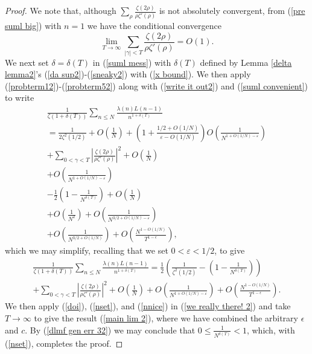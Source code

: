 \documentclass[11pt,article]{amsart}
\numberwithin{equation}{section}
\numberwithin{equation}{section}
\numberwithin{lemma}{section}
\numberwithin{prop}{section}
\begin{document}
\begin{proof}
We note that, although $\sum_{\rho}\frac{\zeta(2\rho)}{\rho\zeta'(\rho)}$ is not absolutely convergent, from (\ref{pre suml big}) with $n=1$ we have the conditional convergence
\begin{equation}
\lim_{T\rightarrow \infty}\sum_{\left|\gamma\right|<T}\frac{\zeta(2\rho)}{\rho\zeta'(\rho)}=O(1). \label{suml convenient}
\end{equation}
We next set $\delta=\delta(T)$ in (\ref{suml mess}) with $\delta(T)$ defined by Lemma \ref{delta lemma2}'s (\ref{da sup2})-(\ref{sneaky2}) with (\ref{x bound}). We then apply (\ref{probterm12})-(\ref{probterm52}) along with (\ref{write it out2}) and (\ref{suml convenient}) to write 
\begin{align}
\frac{1}{\zeta\left(1+\delta(T)\right)}\sum_{n\leq N}\frac{\lambda(n)L(n-1)}{n^{1+\delta(T)}} \nonumber\\ =\frac{1}{2\zeta^{2}(1/2)}+O\left(\frac{1}{N}\right)+\left(1+\frac{1/2+O(1/N)}{\varepsilon-O(1/N)}\right)O\left(\frac{1}{N^{1+O(1/N)-\varepsilon}}\right) \nonumber\\ 
+\sum_{0<\gamma<T}\left|\frac{\zeta(2\rho)}{\rho\zeta'(\rho)}\right|^{2}+O\left(\frac{1}{N}\right) \nonumber\\ +O\left(\frac{1}{N^{1+O(1/N)-\varepsilon}}\right) \nonumber\\ -\frac{1}{2}\left(1-\frac{1}{N^{\delta(T)}}\right)+O\left(\frac{1}{N}\right) \nonumber \\
+O\left(\frac{1}{N^{2}}\right) +O\left(\frac{1}{N^{3/2+O(1/N)-\varepsilon}}\right) \nonumber\\ 
+O\left(\frac{1}{N^{3/2+O(1/N)}}\right) +O\left(\frac{N^{1-O(1/N)}}{T^{1-\epsilon}}\right), \label{suml mess big os}
\end{align}
which we may simplify, recalling that we set $0<\varepsilon<1/2$, to give
\begin{align}
\frac{1}{\zeta\left(1+\delta(T)\right)}\sum_{n\leq N}\frac{\lambda(n)L(n-1)}{n^{1+\delta(T)}}=\frac{1}{2}\left(\frac{1}{\zeta^{2}(1/2)}-\left(1-\frac{1}{N^{\delta(T)}}\right)\right) \nonumber\\ +\sum_{0<\gamma<T}\left|\frac{\zeta(2\rho)}{\rho\zeta'(\rho)}\right|^{2}+O\left(\frac{1}{N}\right)+O\left(\frac{1}{N^{1+O(1/N)-\varepsilon}}\right)+O\left(\frac{N^{1-O(1/N)}}{T^{1-\epsilon}}\right). \label{we really there! 2}
\end{align} 
We then apply (\ref{doi}), (\ref{nset}), and (\ref{nnice}) in (\ref{we really there! 2}) and take $T\rightarrow \infty$ to give the result (\ref{main lim 2}), where we have combined the arbitrary $\epsilon$ and $c$. By (\ref{dlmf gen err 32}) we may conclude that $0\leq \frac{1}{N^{\delta(T)}}<1$, which, with (\ref{nset}), completes the proof. 


\end{proof}
\end{document}
